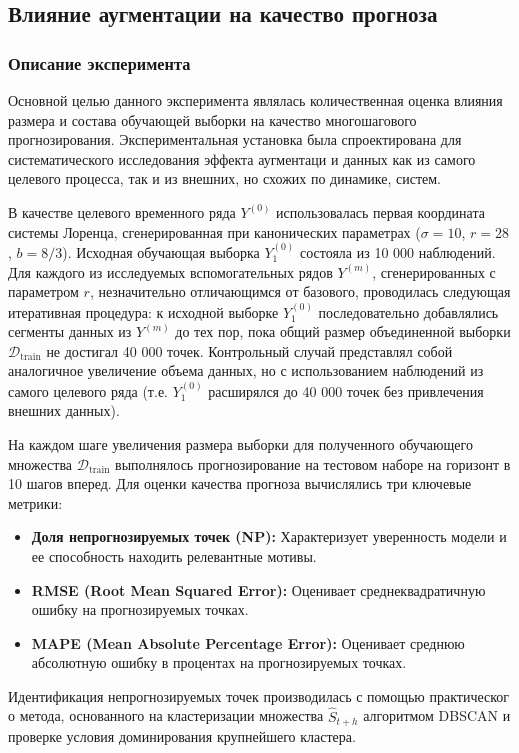 \documentclass[a4paper,12pt]{extarticle}
\begin{document}
\subsection{Влияние аугментации на качество прогноза}
\subsubsection{Описание эксперимента}
Основной целью данного эксперимента являлась количественная оценка влияния размера и
состава обучающей выборки на качество многошагового прогнозирования. Экспериментальная
 установка была спроектирована для систематического исследования эффекта аугментаци
 и данных как из самого целевого процесса, так и из внешних, но схожих по динамике, систем.

В качестве целевого временного ряда $Y^{(0)}$ использовалась первая координата
 системы Лоренца, сгенерированная при канонических параметрах ($\sigma = 10$, $r = 28$, $b = 8/3$).
 Исходная обучающая выборка $Y_1^{(0)}$ состояла из 10 000 наблюдений. Для каждого из исследуемых
  вспомогательных рядов $Y^{(m)}$, сгенерированных с параметром $r$, незначительно отличающимся от
   базового, проводилась следующая итеративная процедура: к исходной выборке $Y_1^{(0)}$
   последовательно добавлялись сегменты данных из $Y^{(m)}$ до тех пор, пока общий размер
   объединенной выборки $\mathcal{D}_{\text{train}}$ не достигал 40 000 точек. Контрольный
   случай представлял собой аналогичное увеличение объема данных, но с использованием наблюдений
    из самого целевого ряда (т.е. $Y_1^{(0)}$ расширялся до 40 000 точек без привлечения внешних данных).

На каждом шаге увеличения размера выборки для полученного обучающего
 множества $\mathcal{D}_{\text{train}}$ выполнялось прогнозирование
 на тестовом наборе на горизонт в 10 шагов вперед. Для оценки качества прогноза вычислялись три ключевые метрики:
\begin{itemize}
    \item \textbf{Доля непрогнозируемых точек (NP):} Характеризует
    уверенность модели и ее способность находить релевантные мотивы.
    \item \textbf{RMSE (Root Mean Squared Error):} Оценивает среднеквадратичную ошибку на прогнозируемых точках.
    \item \textbf{MAPE (Mean Absolute Percentage Error):} Оценивает
    среднюю абсолютную ошибку в процентах на прогнозируемых точках.
\end{itemize}
Идентификация непрогнозируемых точек производилась с помощью практическог
о метода, основанного на кластеризации множества $\hat{S}_{t+h}$ алгоритмом DBSCAN
и проверке условия доминирования крупнейшего кластера.
\end{document}
